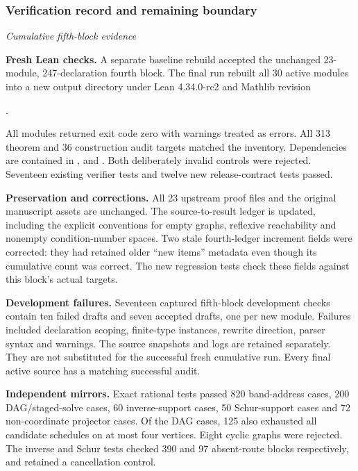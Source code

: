 \subsubsection*{Verification record and remaining boundary}\label{history:supp5:subsection:007}\textit{Cumulative fifth-block evidence}\par
\textbf{Fresh Lean checks.} A separate baseline rebuild accepted the unchanged 23-module, 247-declaration fourth block. The final run rebuilt all 30 active modules into a new output directory under Lean 4.34.0-rc2 and Mathlib revision
\begin{center}.\end{center}
All modules returned exit code zero with warnings treated as errors. All 313 theorem and 36 construction audit targets matched the inventory. Dependencies are contained in ,  and . Both deliberately invalid controls were rejected. Seventeen existing verifier tests and twelve new release-contract tests passed.

\textbf{Preservation and corrections.} All 23 upstream proof files and the original manuscript assets are unchanged. The source-to-result ledger is updated, including the explicit conventions for empty graphs, reflexive reachability and nonempty condition-number spaces. Two stale fourth-ledger increment fields were corrected: they had retained older ``new items'' metadata even though its cumulative count was correct. The new regression tests check these fields against this block's actual targets.

\textbf{Development failures.} Seventeen captured fifth-block development checks contain ten failed drafts and seven accepted drafts, one per new module. Failures included declaration scoping, finite-type instances, rewrite direction, parser syntax and warnings. The source snapshots and logs are retained separately. They are not substituted for the successful fresh cumulative run. Every final active source has a matching successful audit.

\textbf{Independent mirrors.} Exact rational tests passed 820 band-address cases, 200 DAG/staged-solve cases, 60 inverse-support cases, 50 Schur-support cases and 72 non-coordinate projector cases. Of the DAG cases, 125 also exhausted all candidate schedules on at most four vertices. Eight cyclic graphs were rejected. The inverse and Schur tests checked 390 and 97 absent-route blocks respectively, and retained a cancellation control.

